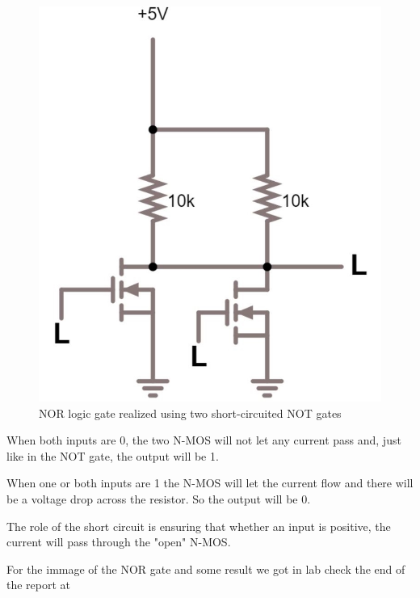 \documentclass{article}
\begin{document}
\begin{figure}[h]
    \centering
    \includegraphics[scale=.3]{IM_NOR_NMOS.JPG}
    \caption{NOR logic gate realized using two short-circuited NOT gates}
    \label{NOR_N-MOS}
\end{figure}

When both inputs are 0, the two N-MOS will not let any current pass and, just like in the NOT gate, the output will be 1.

\vspace{1mm}

When one or both inputs are 1 the N-MOS will let the current flow and there will be a voltage drop across the resistor. So the output will be 0.

\vspace{1mm}

The role of the short circuit is ensuring that whether an input is positive, the current will pass through the "open" N-MOS.

\vspace{3mm}

For the immage of the NOR gate and some result we got in lab check the end of the report at %
\end{document}
